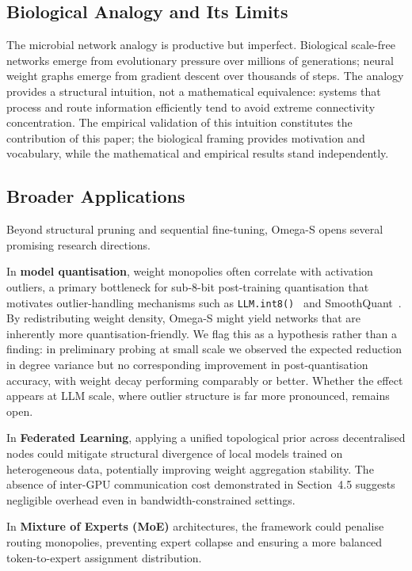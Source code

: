 \documentclass[11pt,a4paper]{article}
\begin{document}
\subsection{Biological Analogy and Its Limits}

The microbial network analogy is productive but imperfect. Biological
scale-free networks emerge from evolutionary pressure over millions of
generations; neural weight graphs emerge from gradient descent over thousands
of steps. The analogy provides a structural intuition, not a mathematical
equivalence: systems that process and route information efficiently tend to
avoid extreme connectivity concentration. The empirical validation of this
intuition constitutes the contribution of this paper; the biological framing
provides motivation and vocabulary, while the mathematical and empirical
results stand independently.

\subsection{Broader Applications}
\label{sec:applications}

Beyond structural pruning and sequential fine-tuning, Omega-S opens
several promising research directions.

In \textbf{model quantisation}, weight monopolies often correlate with
activation outliers, a primary bottleneck for sub-8-bit post-training
quantisation that motivates outlier-handling mechanisms such as
\texttt{LLM.int8()}~\cite{dettmers2022} and SmoothQuant~\cite{xiao2023}. By
redistributing weight density, Omega-S might yield networks that are
inherently more quantisation-friendly. We flag this as a hypothesis rather
than a finding: in preliminary probing at small scale we observed the
expected reduction in degree variance but no corresponding improvement in
post-quantisation accuracy, with weight decay performing comparably or
better. Whether the effect appears at LLM scale, where outlier structure is
far more pronounced, remains open.

In \textbf{Federated Learning}, applying a unified topological prior across
decentralised nodes could mitigate structural divergence of local models
trained on heterogeneous data, potentially improving weight aggregation
stability. The absence of inter-GPU communication cost demonstrated in
Section~4.5 suggests negligible overhead even in bandwidth-constrained
settings.

In \textbf{Mixture of Experts (MoE)} architectures, the framework could
penalise routing monopolies, preventing expert collapse and ensuring a
more balanced token-to-expert assignment distribution.
\end{document}
